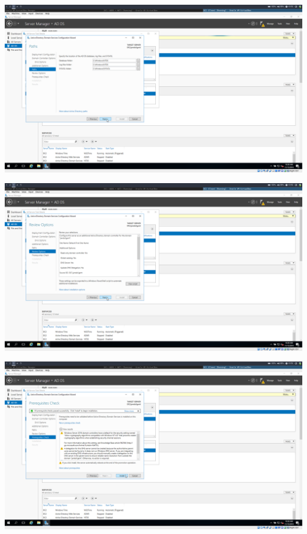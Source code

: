 \documentclass[a4paper]{article}
\begin{document}
\begin{center}
	\includegraphics[width=15cm]{Pictures/DC2/ADDS/1542307825.png}
\end{center}
\begin{center}
	\includegraphics[width=15cm]{Pictures/DC2/ADDS/1542307828.png}
\end{center}
\begin{center}
	\includegraphics[width=15cm]{Pictures/DC2/ADDS/1542307834.png}
\end{center}
\end{document}
